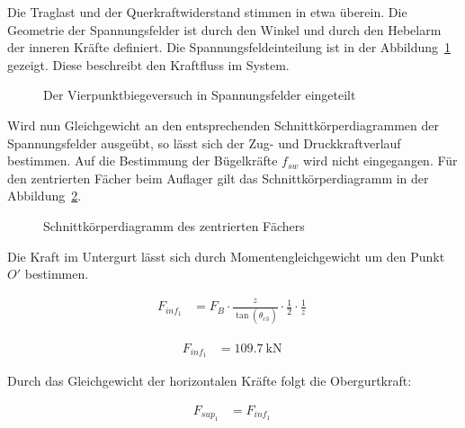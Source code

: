 \documentclass[
  11pt,
  letterpaper,
]{scrreprt}
\begin{document}
Die Traglast und der Querkraftwiderstand stimmen in etwa überein. Die
Geometrie der Spannungsfelder ist durch den Winkel und durch den
Hebelarm der inneren Kräfte definiert. Die Spannungsfeldeinteilung ist
in der Abbildung~\ref{fig-spannungsfelder_sv14} gezeigt. Diese
beschreibt den Kraftfluss im System.

\begin{figure}[H]


\caption{\label{fig-spannungsfelder_sv14}Der Vierpunktbiegeversuch in
Spannungsfelder eingeteilt}

\end{figure}%

Wird nun Gleichgewicht an den entsprechenden Schnittkörperdiagrammen der
Spannungsfelder ausgeübt, so lässt sich der Zug- und Druckkraftverlauf
bestimmen. Auf die Bestimmung der Bügelkräfte \(f_{sw}\) wird nicht
eingegangen. Für den zentrierten Fächer beim Auflager gilt das
Schnittkörperdiagramm in der
Abbildung~\ref{fig-skd_1_spannungsfelder_sv14}.

\begin{figure}[H]


\caption{\label{fig-skd_1_spannungsfelder_sv14}Schnittkörperdiagramm des
zentrierten Fächers}

\end{figure}%

Die Kraft im Untergurt lässt sich durch Momentengleichgewicht um den
Punkt \(O'\) bestimmen.

$$
\begin{aligned}
F_{inf_{1}} &= F_{B} \cdot \frac{ z_{_{}} }{ \tan \left( \theta_{c3_{_{}}} \right) } \cdot \frac{1} { 2 } \cdot \frac{1} { z_{_{}} } \; 
\end{aligned}
$$

$$
\begin{aligned}
F_{inf_{1}} &= 109.7\ \mathrm{kN} \; 
\end{aligned}
$$

Durch das Gleichgewicht der horizontalen Kräfte folgt die Obergurtkraft:

$$
\begin{aligned}
F_{sup_{1}} &= F_{inf_{1}} \; 
\end{aligned}
$$
\end{document}
